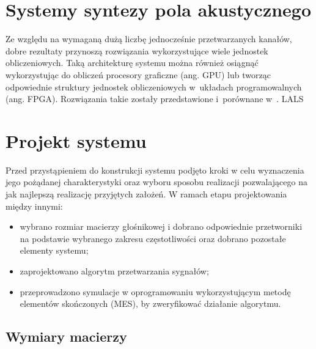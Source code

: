 \documentclass[12pt]{oska}
\let\Oldsection\section
\renewcommand{\section}{\FloatBarrier\Oldsection}
\let\Oldsubsection\subsection
\renewcommand{\subsection}{\FloatBarrier\Oldsubsection}
\begin{document}
\section{Systemy syntezy pola akustycznego}

Ze względu na wymaganą dużą liczbę jednocześnie przetwarzanych kanałów,
dobre rezultaty przynoszą rozwiązania wykorzystujące wiele jednostek obliczeniowych.
Taką architekturę systemu można również osiągnąć wykorzystując
do obliczeń procesory graficzne (ang. GPU) lub tworząc odpowiednie struktury jednostek obliczeniowych
w~układach programowalnych (ang. FPGA). Rozwiązania takie zostały przedstawione i~porównane w~\cite{multiCore}. LALS

\section{Projekt systemu}

Przed przystąpieniem do konstrukcji systemu podjęto kroki w celu wyznaczenia
jego pożądanej charakterystyki oraz wyboru sposobu realizacji pozwalającego na
jak najlepszą realizację przyjętych założeń. W ramach etapu projektowania
między innymi:
\begin{itemize}
  \item wybrano rozmiar macierzy głośnikowej i dobrano odpowiednie przetworniki
    na podstawie wybranego zakresu częstotliwości oraz dobrano pozostałe elementy systemu;
  \item zaprojektowano algorytm przetwarzania sygnałów;
  \item przeprowadzono symulacje w oprogramowaniu wykorzystującym metodę
    elementów skończonych (MES), by zweryfikować działanie algorytmu.
\end{itemize}

\subsection{Wymiary macierzy}
\end{document}
